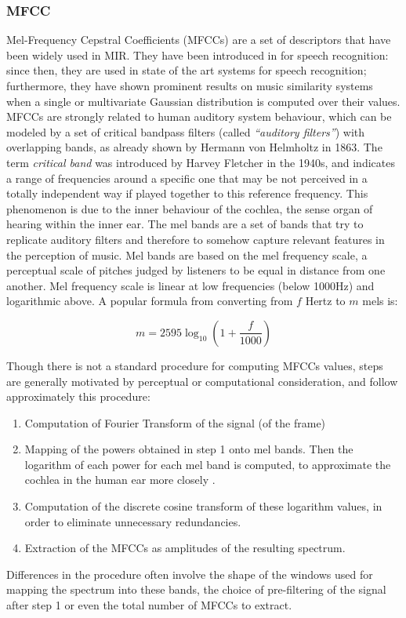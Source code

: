 \subsubsection{MFCC}
Mel-Frequency Cepstral Coefficients (MFCCs) are a set of descriptors that have been widely used in MIR. They have been introduced in \cite{davis80} for speech recognition: since then, they are used in state of the art systems for speech recognition; furthermore, they have shown prominent results on music similarity systems when a single or multivariate Gaussian distribution is computed over their values. \\MFCCs are strongly related to human auditory system behaviour, which can be modeled by a set of critical bandpass filters (called \textit{``auditory filters''}) with overlapping bands, as already shown by Hermann von Helmholtz in 1863. The term \textit{critical band} was introduced by Harvey Fletcher in the 1940s, and indicates a range of frequencies around a specific one that may be not perceived in a totally independent way if played together to this reference frequency. This phenomenon is due to the inner behaviour of the cochlea, the sense organ of hearing within the inner ear. The mel bands are a set of bands that try to replicate auditory filters and therefore to somehow capture relevant features in the perception of music. Mel bands are based on the mel frequency scale, a perceptual scale of pitches judged by listeners to be equal in distance from one another. Mel frequency scale is linear at low frequencies (below 1000Hz) and logarithmic above. A popular formula from converting from $f$ Hertz to $m$ mels is:

\begin{equation}
m = 2595\log_{10}\left(1 + \frac{f}{1000} \right)
\end{equation}

Though there is not a standard procedure for computing MFCCs values, steps are generally motivated by perceptual or computational consideration, and follow approximately this procedure:
\begin{enumerate}
\item Computation of Fourier Transform of the signal (of the frame)
\item Mapping of the powers obtained in step 1 onto mel bands. Then the logarithm of each power for each mel band is computed, to approximate the cochlea in the human ear more closely \cite{mirage07}.
\item Computation of the discrete cosine transform of these logarithm values, in order to eliminate unnecessary redundancies.
\item Extraction of the MFCCs as amplitudes of the resulting spectrum. 
\end{enumerate}
Differences in the procedure often involve the shape of the windows used for mapping the spectrum into these bands, the choice of pre-filtering of the signal after step 1 or even the total number of MFCCs to extract. 

